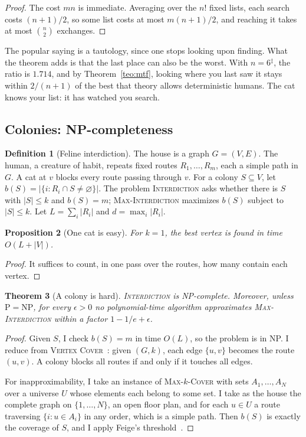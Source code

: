 \documentclass[11pt,a4paper]{article}
\theoremstyle{plain}
\newtheorem{teorema}{Theorem}[section]
\newtheorem{proposicion}[teorema]{Proposition}
\theoremstyle{definition}
\newtheorem{definicion}[teorema]{Definition}
\theoremstyle{remark}
\numberwithin{equation}{section}
\newcommand{\calib}{{\ensuremath{^{\ddagger}}}}
\newcommand{\prob}[1]{\textnormal{\textsc{#1}}}
\begin{document}
\begin{proof}
The cost $mn$ is immediate. Averaging over the $n!$ fixed lists, each search costs $(n+1)/2$, so some list costs at most $m(n+1)/2$, and reaching it takes at most $\binom n2$ exchanges.
\end{proof}

The popular saying is a tautology, since one stops looking upon finding. What the theorem adds is that the last place can also be the worst. With $n=6$\calib, the ratio is $1.714$, and by Theorem~\ref{teo:mtf}, looking where you last saw it stays within $2/(n+1)$ of the best that theory allows deterministic humans. The cat knows your list: it has watched you search.

\subsection{Colonies: NP-completeness}

\begin{definicion}[Feline interdiction]
The house is a graph $G=(V,E)$. The human, a creature of habit, repeats fixed routes $R_1,\dots,R_m$, each a simple path in $G$. A cat at $v$ blocks every route passing through $v$. For a colony $S\subseteq V$, let $b(S)=|\{i:R_i\cap S\ne\varnothing\}|$. The problem \prob{Interdiction} asks whether there is $S$ with $|S|\le k$ and $b(S)=m$; \prob{Max-Interdiction} maximizes $b(S)$ subject to $|S|\le k$. Let $L=\sum_i|R_i|$ and $d=\max_i|R_i|$.
\end{definicion}

\begin{proposicion}[One cat is easy]\label{prop:ungato}
For $k=1$, the best vertex is found in time $O(L+|V|)$.
\end{proposicion}

\begin{proof}
It suffices to count, in one pass over the routes, how many contain each vertex.
\end{proof}

\begin{teorema}[A colony is hard]\label{teo:npc}
\prob{Interdiction} is NP-complete. Moreover, unless $\mathrm{P}=\mathrm{NP}$, for every $\epsilon>0$ no polynomial-time algorithm approximates \prob{Max-Interdiction} within a factor $1-1/e+\epsilon$.
\end{teorema}

\begin{proof}
Given $S$, I check $b(S)=m$ in time $O(L)$, so the problem is in NP. I reduce from \prob{Vertex Cover}~\cite{karp}: given $(G,k)$, each edge $\{u,v\}$ becomes the route $(u,v)$. A colony blocks all routes if and only if it touches all edges.

For inapproximability, I take an instance of \prob{Max-$k$-Cover} with sets $A_1,\dots,A_N$ over a universe $U$ whose elements each belong to some set. I take as the house the complete graph on $\{1,\dots,N\}$, an open floor plan, and for each $u\in U$ a route traversing $\{i:u\in A_i\}$ in any order, which is a simple path. Then $b(S)$ is exactly the coverage of $S$, and I apply Feige's threshold~\cite{feige}.
\end{proof}
\end{document}
